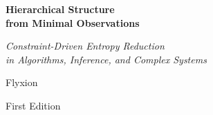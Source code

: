 \begin{titlepage}
\centering
\vspace*{2.5cm}

{\Huge\bfseries Hierarchical Structure\\[0.4em]
from Minimal Observations}

\vspace{1.0cm}
{\large\itshape Constraint-Driven Entropy Reduction\\
in Algorithms, Inference, and Complex Systems}

\vspace{2.5cm}
{\Large Flyxion}

\vfill

{\normalsize First Edition}

\end{titlepage}
